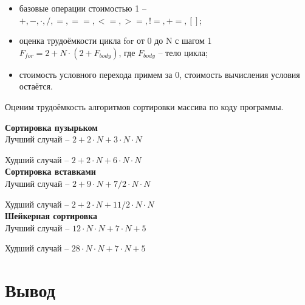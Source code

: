 \documentclass[12pt,a4paper]{report}
\begin{document}
\begin{itemize}
    \item базовые операции стоимостью 1 -- $+, -, \cdot , /, =, ==, <=, >=, !=, +=, []$;
    \item оценка трудоёмкости цикла for от 0 до N с шагом 1 $F_{for} = 2 + N \cdot (2 + F_{body})$, где $F_{body}$ -- тело цикла;
    \item стоимость условного перехода примем за 0, стоимость вычисления условия остаётся. 
\end{itemize}


Оценим трудоёмкость алгоритмов сортировки массива по коду программы.

\textbf{Сортировка пузырьком} \\



Лучший случай -- $2 + 2 \cdot N + 3 \cdot N \cdot N$

Худший случай -- $2 + 2 \cdot N + 6 \cdot N \cdot N$ \\

\newpage
\textbf{Сортировка вставками} \\



Лучший случай -- $2 + 9 \cdot N + 7/2 \cdot N \cdot N$

Худший случай -- $2 + 2 \cdot N + 11/2 \cdot N \cdot N$ \\

\textbf{Шейкерная сортировка} \\

Лучший случай -- $12 \cdot N \cdot N + 7 \cdot N + 5$

Худший случай -- $28 \cdot N \cdot N + 7 \cdot N + 5$

\section{Вывод}
\end{document}
